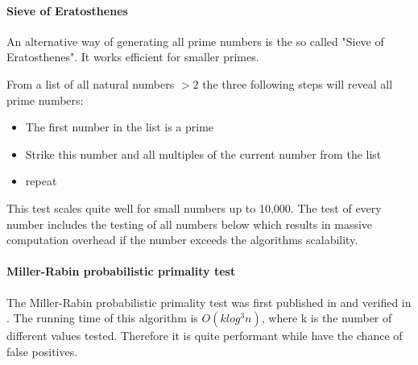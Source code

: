 
\paragraph{Sieve of Eratosthenes}
An alternative way of generating all prime numbers is the so called "Sieve of Eratosthenes". It works efficient for smaller primes.

From a list of all natural numbers $> 2$ the three following steps will reveal all prime numbers:

\begin{itemize}%
   \item The first number in the list is a prime
   \item Strike this number and all multiples of the current number from the list
   \item repeat  
\end{itemize}%

This test scales quite well for small numbers up to 10,000. The test of every number includes the testing of all numbers below which results in massive computation overhead if the number exceeds the algorithms scalability.

\paragraph{Miller-Rabin probabilistic primality test}
The Miller-Rabin probabilistic primality test was first published in \cite{MRPT} and verified in \cite{MRVer}. The running time of this algorithm is $O(k log^{3} n)$, where k is the number of different values tested. Therefore it is quite performant while have the chance of false positives.

